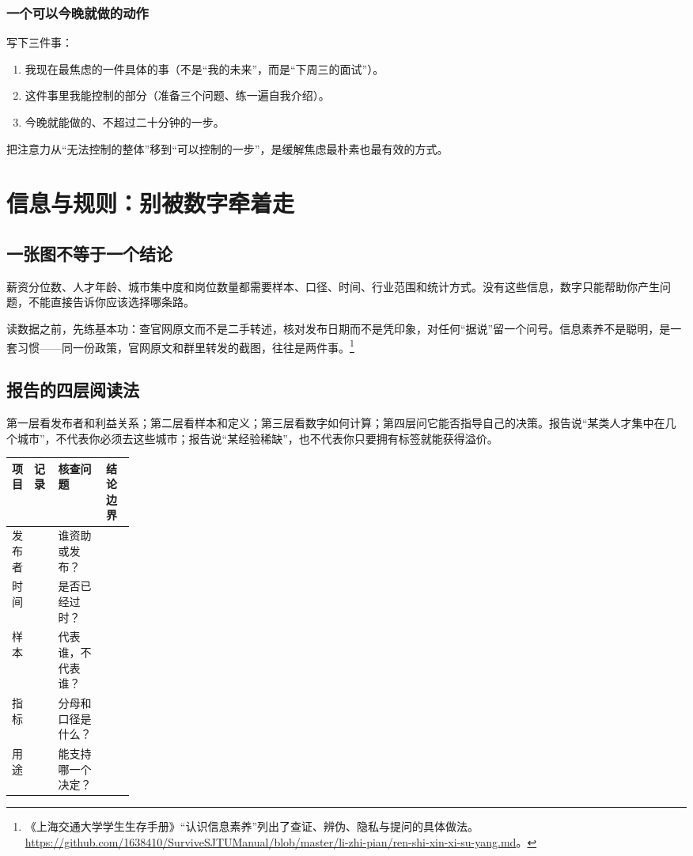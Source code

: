 \documentclass[UTF8,zihao=5,openany]{ctexbook}
\begin{document}
\subsection{一个可以今晚就做的动作}
写下三件事：
\begin{enumerate}
\item 我现在最焦虑的一件具体的事（不是“我的未来”，而是“下周三的面试”）。
\item 这件事里我能控制的部分（准备三个问题、练一遍自我介绍）。
\item 今晚就能做的、不超过二十分钟的一步。
\end{enumerate}

把注意力从“无法控制的整体”移到“可以控制的一步”，是缓解焦虑最朴素也最有效的方式。


\chapter{信息与规则：别被数字牵着走}
\section{一张图不等于一个结论}
薪资分位数、人才年龄、城市集中度和岗位数量都需要样本、口径、时间、行业范围和统计方式。没有这些信息，数字只能帮助你产生问题，不能直接告诉你应该选择哪条路。

读数据之前，先练基本功：查官网原文而不是二手转述，核对发布日期而不是凭印象，对任何“据说”留一个问号。信息素养不是聪明，是一套习惯——同一份政策，官网原文和群里转发的截图，往往是两件事。\footnote{《上海交通大学学生生存手册》“认识信息素养”列出了查证、辨伪、隐私与提问的具体做法。\url{https://github.com/1638410/SurviveSJTUManual/blob/master/li-zhi-pian/ren-shi-xin-xi-su-yang.md}。}

\section{报告的四层阅读法}
第一层看发布者和利益关系；第二层看样本和定义；第三层看数字如何计算；第四层问它能否指导自己的决策。报告说“某类人才集中在几个城市”，不代表你必须去这些城市；报告说“某经验稀缺”，也不代表你只要拥有标签就能获得溢价。

\begin{toolbox}
\begin{center}\small
\begin{tabularx}{0.92\linewidth}{p{0.18\linewidth}YYY}
\toprule
项目 & 记录 & 核查问题 & 结论边界 \\
\midrule
发布者 & & 谁资助或发布？ & \\
时间 & & 是否已经过时？ & \\
样本 & & 代表谁，不代表谁？ & \\
指标 & & 分母和口径是什么？ & \\
用途 & & 能支持哪一个决定？ & \\
\bottomrule
\end{tabularx}
\end{center}
\end{toolbox}
\end{document}
